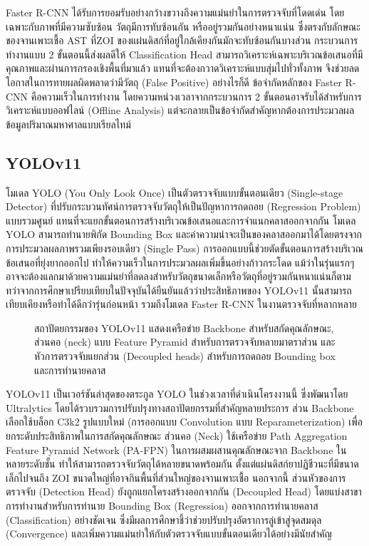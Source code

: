 Faster R-CNN ได้รับการยอมรับอย่างกว้างขวางถึงความแม่นยำในการตรวจจับที่โดดเด่น โดยเฉพาะกับภาพที่มีความซับซ้อน วัตถุมีการทับซ้อนกัน หรืออยู่รวมกันอย่างหนาแน่น ซึ่งตรงกับลักษณะของจานเพาะเชื้อ AST ที่ZOI ของแผ่นดิสก์ที่อยู่ใกล้เคียงกันมักจะทับซ้อนกันบางส่วน กระบวนการทำงานแบบ 2 ขั้นตอนนี้ส่งผลดีให้ Classification Head สามารถวิเคราะห์เฉพาะบริเวณข้อเสนอที่มีคุณภาพและผ่านการกรองเชิงพื้นที่มาแล้ว แทนที่จะต้องกวาดวิเคราะห์แบบสุ่มไปทั่วทั้งภาพ จึงช่วยลดโอกาสในการทายผลผิดพลาดว่ามีวัตถุ (False Positive) อย่างไรก็ดี ข้อจำกัดหลักของ Faster R-CNN คือความเร็วในการทำงาน โดยความหน่วงเวลาจากกระบวนการ 2 ขั้นตอนอาจรับได้สำหรับการวิเคราะห์แบบออฟไลน์ (Offline Analysis) แต่จะกลายเป็นข้อจำกัดสำคัญหากต้องการประมวลผลข้อมูลปริมาณมหาศาลแบบเรียลไทม์

\subsection{YOLOv11}

โมเดล YOLO (You Only Look Once) เป็นตัวตรวจจับแบบขั้นตอนเดียว (Single-stage Detector) ที่ปรับกระบวนทัศน์การตรวจจับวัตถุให้เป็นปัญหาการถดถอย (Regression Problem) แบบรวมศูนย์ แทนที่จะแยกขั้นตอนการสร้างบริเวณข้อเสนอและการจำแนกคลาสออกจากกัน โมเดล YOLO สามารถทำนายพิกัด Bounding Box และค่าความน่าจะเป็นของคลาสออกมาได้โดยตรงจากการประมวลผลภาพรวมเพียงรอบเดียว (Single Pass) \cite{wang2024yolov11,khanam2024yolov11} การออกแบบนี้ช่วยตัดขั้นตอนการสร้างบริเวณข้อเสนอที่ยุ่งยากออกไป ทำให้ความเร็วในการประมวลผลเพิ่มขึ้นอย่างก้าวกระโดด แม้ว่าในรุ่นแรกๆ อาจจะต้องแลกมาด้วยความแม่นยำที่ลดลงสำหรับวัตถุขนาดเล็กหรือวัตถุที่อยู่รวมกันหนาแน่นก็ตาม ทว่าจากการศึกษาเปรียบเทียบในปัจจุบันได้ยืนยันแล้วว่าประสิทธิภาพของ YOLOv11 นั้นสามารถเทียบเคียงหรือทำได้ดีกว่ารุ่นก่อนหน้า รวมถึงโมเดล Faster R-CNN ในงานตรวจจับที่หลากหลาย \cite{sharma2024yolo_comparison}

\begin{figure}[H]
  \centering
  \caption{สถาปัตยกรรมของ YOLOv11 แสดงเครือข่าย Backbone สำหรับสกัดคุณลักษณะ,
    ส่วนคอ (neck) แบบ Feature Pyramid สำหรับการตรวจจับหลายมาตราส่วน
    และหัวการตรวจจับแยกส่วน (Decoupled heads) สำหรับการถดถอย Bounding box และการทำนายคลาส \cite{wang2024yolov11}}
  \label{fig:yolov11}
\end{figure}

YOLOv11 เป็นเวอร์ชันล่าสุดของตระกูล YOLO ในช่วงเวลาที่ดำเนินโครงงานนี้ ซึ่งพัฒนาโดย Ultralytics โดยได้รวบรวมการปรับปรุงทางสถาปัตยกรรมที่สำคัญหลายประการ \cite{wang2024yolov11} ส่วน Backbone เลือกใช้บล็อก C3k2 รูปแบบใหม่ (การออกแบบ Convolution แบบ Reparameterization) เพื่อยกระดับประสิทธิภาพในการสกัดคุณลักษณะ ส่วนคอ (Neck) ใช้เครือข่าย Path Aggregation Feature Pyramid Network (PA-FPN) ในการผสมผสานคุณลักษณะจาก Backbone ในหลายระดับชั้น ทำให้สามารถตรวจจับวัตถุได้หลายขนาดพร้อมกัน ตั้งแต่แผ่นดิสก์ยาปฏิชีวนะที่มีขนาดเล็กไปจนถึง ZOI ขนาดใหญ่ที่อาจกินพื้นที่ส่วนใหญ่ของจานเพาะเชื้อ นอกจากนี้ ส่วนหัวของการตรวจจับ (Detection Head) ยังถูกแยกโครงสร้างออกจากกัน (Decoupled Head) โดยแบ่งสาขาการทำงานสำหรับการทำนาย Bounding Box (Regression) ออกจากการทำนายคลาส (Classification) อย่างชัดเจน ซึ่งมีผลการศึกษาชี้ว่าช่วยปรับปรุงอัตราการลู่เข้าสู่จุดสมดุล (Convergence) และเพิ่มความแม่นยำให้กับตัวตรวจจับแบบขั้นตอนเดียวได้อย่างมีนัยสำคัญ

